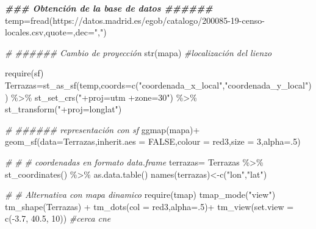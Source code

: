 \documentclass[
]{article}
\newenvironment{Shaded}{\begin{snugshade}}{\end{snugshade}}
\newcommand{\AttributeTok}[1]{\textcolor[rgb]{0.77,0.63,0.00}{#1}}
\newcommand{\CommentTok}[1]{\textcolor[rgb]{0.56,0.35,0.01}{\textit{#1}}}
\newcommand{\ConstantTok}[1]{\textcolor[rgb]{0.00,0.00,0.00}{#1}}
\newcommand{\DecValTok}[1]{\textcolor[rgb]{0.00,0.00,0.81}{#1}}
\newcommand{\DocumentationTok}[1]{\textcolor[rgb]{0.56,0.35,0.01}{\textbf{\textit{#1}}}}
\newcommand{\FloatTok}[1]{\textcolor[rgb]{0.00,0.00,0.81}{#1}}
\newcommand{\FunctionTok}[1]{\textcolor[rgb]{0.00,0.00,0.00}{#1}}
\newcommand{\NormalTok}[1]{#1}
\newcommand{\OtherTok}[1]{\textcolor[rgb]{0.56,0.35,0.01}{#1}}
\newcommand{\SpecialCharTok}[1]{\textcolor[rgb]{0.00,0.00,0.00}{#1}}
\newcommand{\StringTok}[1]{\textcolor[rgb]{0.31,0.60,0.02}{#1}}
\numberwithin{ejcnt}{section}
\begin{document}
\begin{Shaded}
\begin{Highlighting}[]
\DocumentationTok{\#\#\# Obtención de la base de datos \#\#\#\#\#\#}
\NormalTok{temp}\OtherTok{=}\FunctionTok{fread}\NormalTok{(}\StringTok{\textquotesingle{}https://datos.madrid.es/egob/catalogo/200085{-}19{-}censo{-}locales.csv\textquotesingle{}}\NormalTok{,}\AttributeTok{quote=}\StringTok{\textquotesingle{}\textquotesingle{}}\NormalTok{,}\AttributeTok{dec=}\StringTok{","}\NormalTok{)}

\CommentTok{\# \#\#\#\#\#\# Cambio de proyección}
\FunctionTok{str}\NormalTok{(mapa) }\CommentTok{\#localización del lienzo}

\FunctionTok{require}\NormalTok{(sf)}
\NormalTok{Terrazas}\OtherTok{=}\FunctionTok{st\_as\_sf}\NormalTok{(temp,}\AttributeTok{coords=}\FunctionTok{c}\NormalTok{(}\StringTok{"coordenada\_x\_local"}\NormalTok{,}\StringTok{"coordenada\_y\_local"}\NormalTok{))  }\SpecialCharTok{\%\textgreater{}\%}
  \FunctionTok{st\_set\_crs}\NormalTok{(}\StringTok{"+proj=utm +zone=30"}\NormalTok{) }\SpecialCharTok{\%\textgreater{}\%}
  \FunctionTok{st\_transform}\NormalTok{(}\StringTok{"+proj=longlat"}\NormalTok{)}

\CommentTok{\# \#\#\#\#\#\# representación con sf}
\FunctionTok{ggmap}\NormalTok{(mapa)}\SpecialCharTok{+}
  \FunctionTok{geom\_sf}\NormalTok{(}\AttributeTok{data=}\NormalTok{Terrazas,}\AttributeTok{inherit.aes =} \ConstantTok{FALSE}\NormalTok{,}\AttributeTok{colour =} \StringTok{\textquotesingle{}red3\textquotesingle{}}\NormalTok{,}\AttributeTok{size =} \DecValTok{3}\NormalTok{,}\AttributeTok{alpha=}\NormalTok{.}\DecValTok{5}\NormalTok{)}

\CommentTok{\# }
\CommentTok{\# \# coordenadas en formato data.frame}
\NormalTok{terrazas}\OtherTok{=}\NormalTok{ Terrazas }\SpecialCharTok{\%\textgreater{}\%} \FunctionTok{st\_coordinates}\NormalTok{() }\SpecialCharTok{\%\textgreater{}\%} \FunctionTok{as.data.table}\NormalTok{()}
\FunctionTok{names}\NormalTok{(terrazas)}\OtherTok{\textless{}{-}}\FunctionTok{c}\NormalTok{(}\StringTok{"lon"}\NormalTok{,}\StringTok{"lat"}\NormalTok{)}


\CommentTok{\# \# Alternativa con mapa dinamico}
\FunctionTok{require}\NormalTok{(tmap)}
\FunctionTok{tmap\_mode}\NormalTok{(}\StringTok{"view"}\NormalTok{)}
\FunctionTok{tm\_shape}\NormalTok{(Terrazas) }\SpecialCharTok{+}
    \FunctionTok{tm\_dots}\NormalTok{(}\AttributeTok{col =} \StringTok{\textquotesingle{}red3\textquotesingle{}}\NormalTok{,}\AttributeTok{alpha=}\NormalTok{.}\DecValTok{5}\NormalTok{)}\SpecialCharTok{+}
    \FunctionTok{tm\_view}\NormalTok{(}\AttributeTok{set.view =} \FunctionTok{c}\NormalTok{(}\SpecialCharTok{{-}}\FloatTok{3.7}\NormalTok{, }\FloatTok{40.5}\NormalTok{, }\DecValTok{10}\NormalTok{)) }\CommentTok{\#cerca cne}
\end{Highlighting}
\end{Shaded}
\end{document}
